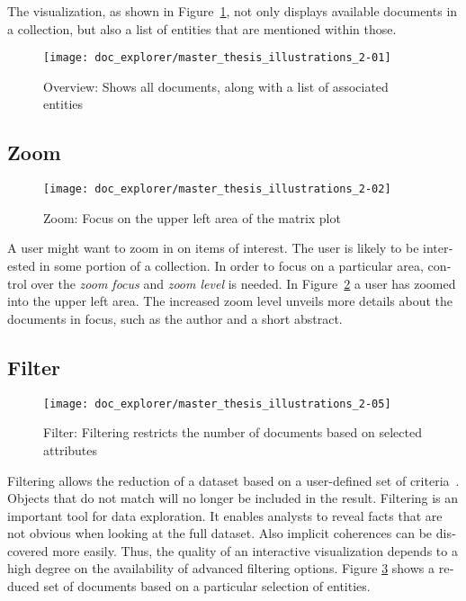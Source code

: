 \begin{english}
The visualization, as shown in Figure~\ref{fig:overview}, not only displays available documents in a collection, but also a list of entities that are mentioned within those.

\begin{figure}
\centering
\texttt{[image: doc\_explorer/master\_thesis\_illustrations\_2-01]}
\caption{Overview: Shows all documents, along with a list of associated entities}
\label{fig:overview}
\end{figure}


\subsection{Zoom}

\begin{figure}
\centering
\texttt{[image: doc\_explorer/master\_thesis\_illustrations\_2-02]}
\caption{Zoom: Focus on the upper left area of the matrix plot}
\label{fig:zoom}
\end{figure}

A user might want to zoom in on items of interest. The user is likely to be interested in some portion of a collection. In order to focus on a particular area, control over the \emph{zoom focus} and \emph{zoom level} is needed. In Figure~\ref{fig:zoom} a user has zoomed into the upper left area. The increased zoom level unveils more details about the documents in focus, such as the author and a short abstract.

\subsection{Filter}

\begin{figure}
\centering
\texttt{[image: doc\_explorer/master\_thesis\_illustrations\_2-05]}
\caption{Filter: Filtering restricts the number of documents based on selected attributes}
\label{fig:filtering}
\end{figure}

Filtering allows the reduction of a dataset based on a user-defined set of criteria~\cite{Ahlberg92dynamicqueries}. Objects that do not match will no longer be included in the result. Filtering is an important tool for data exploration. It enables analysts to reveal facts that are not obvious when looking at the full dataset. Also implicit coherences can be discovered more easily. Thus, the quality of an interactive visualization depends to a high degree on the availability of advanced filtering options. Figure \ref{fig:filtering} shows a reduced set of documents based on a particular selection of entities.



\end{english}
